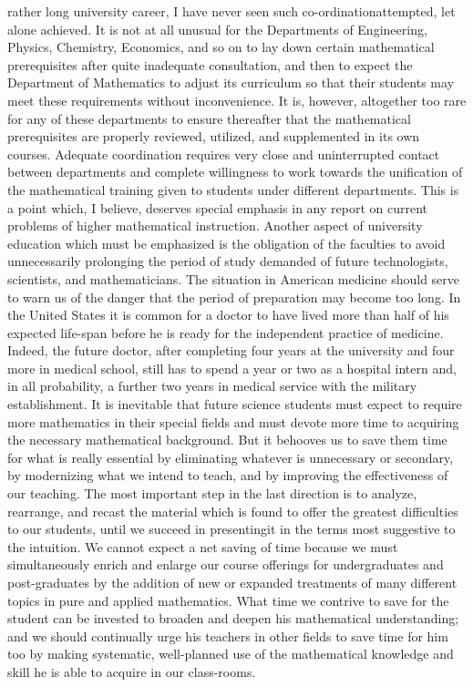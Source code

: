 rather long university career, I have never seen such co-ordination\pageoriginale attempted, let alone achieved. It is not at all unusual for the Departments of Engineering, Physics, Chemistry, Economics, and so on to lay down certain mathematical prerequisites after quite inadequate consultation, and then to expect the Department of Mathematics to adjust its curriculum so that their students may meet these requirements without inconvenience. It is, however, altogether too rare for any of these departments to ensure thereafter that the mathematical prerequisites are properly reviewed, utilized, and supplemented in its own courses. Adequate coordination requires very close and uninterrupted contact between departments and complete willingness to work towards the unification of the mathematical training given to students under different departments. This is a point which, I believe, deserves special emphasis in any report on current problems of higher mathematical instruction. Another aspect of university education which must be emphasized is the obligation of the faculties to avoid unnecessarily prolonging the period of study demanded of future technologists, scientists, and mathematicians. The situation in American medicine should serve to warn us of the danger that the period of preparation may become too long. In the United States it is common for a doctor to have lived more than half of his expected life-span before he is ready for the independent practice of medicine. Indeed, the future doctor, after completing four years at the university and four more in medical school, still has to spend a year or two as a hospital intern and, in all probability, a further two years in medical service with the military establishment. It is inevitable that future science students must expect to require more mathematics in their special fields and must devote more time to acquiring the necessary mathematical background. But it behooves us to save them time for what is really essential by eliminating whatever is unnecessary or secondary, by modernizing what we intend to teach, and by improving the effectiveness of our teaching. The most important step in the last direction is to analyze, rearrange, and recast the material which is found to offer the greatest difficulties to our students, until we succeed in presenting\pageoriginale it in the terms most suggestive to the intuition. We cannot expect a net saving of time because we must simultaneously enrich and enlarge our course offerings for undergraduates and post-graduates by the addition of new or expanded treatments of many different topics in pure and applied mathematics. What time we contrive to save for the student can be invested to broaden and deepen his mathematical understanding; and we should continually urge his teachers in other fields to save time for him too by making systematic, well-planned use of the mathematical knowledge and skill he is able to acquire in our class-rooms.

